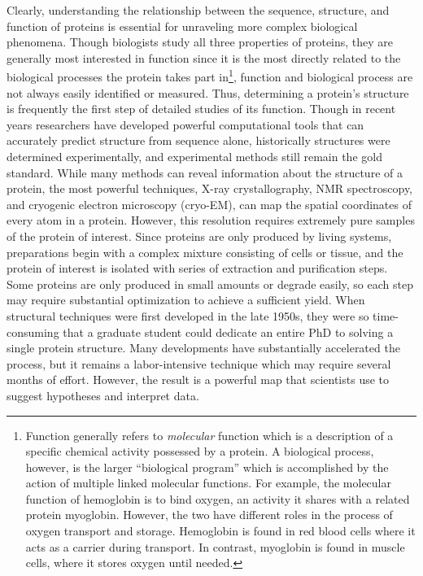 Clearly, understanding the relationship between the sequence, structure, and function of proteins is essential for unraveling more complex biological phenomena. Though biologists study all three properties of proteins, they are generally most interested in function since it is the most directly related to the biological processes the protein takes part in\footnote{Function generally refers to \textit{molecular} function which is a description of a specific chemical activity possessed by a protein. A biological process, however, is the larger ``biological program'' which is accomplished by the action of multiple linked molecular functions. For example, the molecular function of hemoglobin is to bind oxygen, an activity it shares with a related protein myoglobin. However, the two have different roles in the process of oxygen transport and storage. Hemoglobin is found in red blood cells where it acts as a carrier during transport. In contrast, myoglobin is found in muscle cells, where it stores oxygen until needed.}, function and biological process are not always easily identified or measured. Thus, determining a protein's structure is frequently the first step of detailed studies of its function. Though in recent years researchers have developed powerful computational tools that can accurately predict structure from sequence alone, historically structures were determined experimentally, and experimental methods still remain the gold standard. While many methods can reveal information about the structure of a protein, the most powerful techniques, X-ray crystallography, NMR spectroscopy, and cryogenic electron microscopy (cryo-EM), can map the spatial coordinates of every atom in a protein. However, this resolution requires extremely pure samples of the protein of interest. Since proteins are only produced by living systems, preparations begin with a complex mixture consisting of cells or tissue, and the protein of interest is isolated with series of extraction and purification steps. Some proteins are only produced in small amounts or degrade easily, so each step may require substantial optimization to achieve a sufficient yield. When structural techniques were first developed in the late 1950s, they were so time-consuming that a graduate student could dedicate an entire PhD to solving a single protein structure. Many developments have substantially accelerated the process, but it remains a labor-intensive technique which may require several months of effort. However, the result is a powerful map that scientists use to suggest hypotheses and interpret data.

